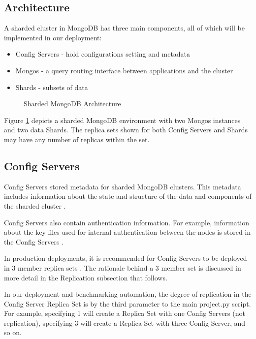 \documentclass[9pt,twocolumn,twoside]{../../styles/osajnl}
\begin{document}
\subsection{Architecture}

A sharded cluster in MongoDB has three main components, all of which
will be implemented in our deployment:

\begin{itemize}
\item Config Servers - hold configurations setting and metadata
\item Mongos - a query routing interface between applications and the cluster
\item Shards - subsets of data
\end{itemize}

\begin{figure}[htbp]
\centering
{}
\caption{Sharded MongoDB Architecture \cite{www-mongoComponents}}
\label{fig:mongodb-arch}
\end{figure}


Figure \ref{fig:mongodb-arch} depicts a sharded MongoDB environment
with two Mongos instances and two data Shards. The replica sets shown
for both Config Servers and Shards may have any number of replicas
within the set.

\subsection{Config Servers}

Config Servers stored metadata for sharded MongoDB clusters. This
metadata includes information about the state and structure of the
data and components of the sharded cluster \cite{www-mongoConfig}.

Config Servers also contain authentication information. For example,
information about the key files used for internal authentication
between the nodes is stored in the Config Servers
\cite{www-mongoConfig}.

In production deployments, it is recommended for Config Servers to be
deployed in 3 member replica sets \cite{www-mongoComponents}. The
rationale behind a 3 member set is discussed in more detail in the
Replication subsection that follows.

In our deployment and benchmarking automation, the degree of
replication in the Config Server Replica Set is by the third parameter
to the main project.py script. For example, specifying 1 will create a
Replica Set with one Config Servers (not replication), specifying 3
will create a Replica Set with three Config Server, and so on.
\end{document}
